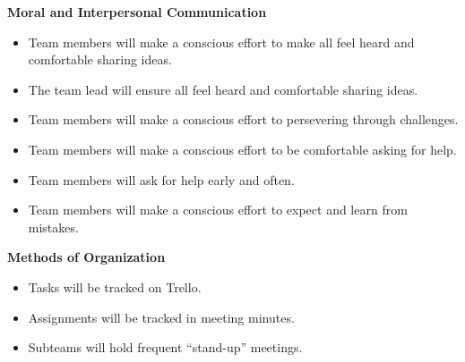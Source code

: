 \textbf{Moral and Interpersonal Communication}

\begin{itemize}
\item Team members will make a conscious effort to make all feel heard and comfortable sharing ideas.
\item The team lead will ensure all feel heard and comfortable sharing ideas.
\item Team members will make a conscious effort to persevering through challenges.
\item Team members will make a conscious effort to be comfortable asking for help.
\item Team members will ask for help early and often.
\item Team members will make a conscious effort to expect and learn from mistakes.
\end{itemize}

\textbf{Methods of Organization}

\begin{itemize}
\item Tasks will be tracked on Trello.
\item Assignments will be tracked in meeting minutes.
\item Subteams will hold frequent “stand-up” meetings.
\end{itemize}

